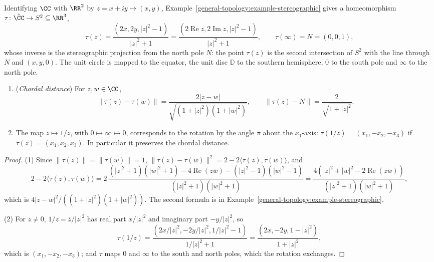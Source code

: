 Identifying $\CC$ with $\RR^2$ by $z = x + iy \mapsto (x, y)$, Example~\ref{general-topology:example-stereographic} gives a homeomorphism $\tau \colon \hat{\CC} \to S^2 \subseteq \RR^3$,
\[
\tau(z) = \frac{(2x, 2y, |z|^2 - 1)}{|z|^2 + 1} = \frac{(2\operatorname{Re}z, 2\operatorname{Im}z, |z|^2 - 1)}{|z|^2 + 1}, \qquad \tau(\infty) = N = (0, 0, 1),
\]
whose inverse is the stereographic projection from the north pole $N$: the point $\tau(z)$ is the second intersection of $S^2$ with the line through $N$ and $(x, y, 0)$. The unit circle is mapped to the
equator, the unit disc $\mathbb{D}$ to the southern hemisphere, $0$ to the south pole and $\infty$ to the north pole.

\begin{proposition}\label{complex-analysis:proposition-chordal}
\begin{enumerate}
\item (\emph{Chordal distance}) For $z, w \in \CC$,
\[
\|\tau(z) - \tau(w)\| = \frac{2|z - w|}{\sqrt{(1 + |z|^2)(1 + |w|^2)}}, \qquad \|\tau(z) - N\| = \frac{2}{\sqrt{1 + |z|^2}}.
\]
\item The map $z \mapsto 1/z$, with $0 \mapsto \infty \mapsto 0$, corresponds to the rotation by the angle $\pi$ about the $x_1$-axis: $\tau(1/z) = (x_1, -x_2, -x_3)$ if $\tau(z) = (x_1, x_2, x_3)$. In particular it
preserves the chordal distance.
\end{enumerate}
\end{proposition}

\begin{proof}
(1) Since $\|\tau(z)\| = \|\tau(w)\| = 1$, $\|\tau(z) - \tau(w)\|^2 = 2 - 2\langle\tau(z), \tau(w)\rangle$, and
\[
2 - 2\langle\tau(z), \tau(w)\rangle = 2\,\frac{(|z|^2 + 1)(|w|^2 + 1) - 4\operatorname{Re}(z\bar w) - (|z|^2 - 1)(|w|^2 - 1)}{(|z|^2 + 1)(|w|^2 + 1)}
= \frac{4(|z|^2 + |w|^2 - 2\operatorname{Re}(z\bar w))}{(|z|^2 + 1)(|w|^2 + 1)},
\]
which is $4|z - w|^2/((1 + |z|^2)(1 + |w|^2))$. The second formula is in Example~\ref{general-topology:example-stereographic}.

(2) For $z \neq 0$, $1/z = \bar z/|z|^2$ has real part $x/|z|^2$ and imaginary part $-y/|z|^2$, so
\[
\tau(1/z) = \frac{(2x/|z|^2, -2y/|z|^2, 1/|z|^2 - 1)}{1/|z|^2 + 1} = \frac{(2x, -2y, 1 - |z|^2)}{1 + |z|^2},
\]
which is $(x_1, -x_2, -x_3)$; and $\tau$ maps $0$ and $\infty$ to the south and north poles, which the rotation exchanges.
\end{proof}

